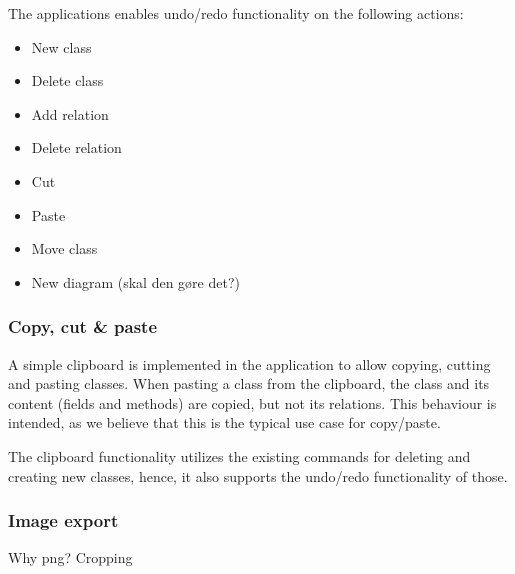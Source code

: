 The applications enables undo/redo functionality on the following actions:


\begin{itemize}
	\item New class
	\item Delete class
	\item Add relation
	\item Delete relation
	\item Cut
	\item Paste
	\item Move class
	\item New diagram (skal den gøre det?)
\end{itemize}


\subsubsection{Copy, cut \& paste}
A simple clipboard is implemented in the application to allow copying, cutting and pasting classes. When pasting a class from the clipboard, the class and its content (fields and methods) are copied, but not its relations. This behaviour is intended, as we believe that this is the typical use case for copy/paste.

The clipboard functionality utilizes the existing commands for deleting and creating new classes, hence, it also supports the undo/redo functionality of those.


\subsubsection{Image export}
Why png? Cropping









